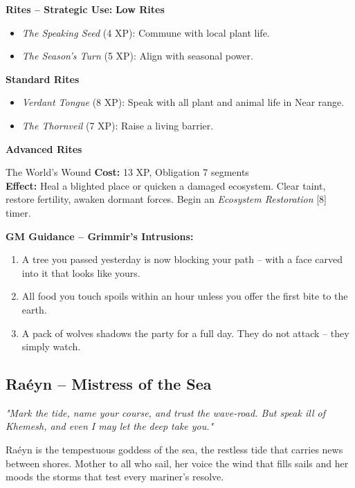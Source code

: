 \documentclass[10pt,a5paper]{book}
\begin{document}
\textbf{Rites -- Strategic Use:}
\textbf{Low Rites}
\begin{itemize}
    \item \textit{The Speaking Seed} (4 XP): Commune with local plant life.
    \item \textit{The Season's Turn} (5 XP): Align with seasonal power.
\end{itemize}
\textbf{Standard Rites}
\begin{itemize}
    \item \textit{Verdant Tongue} (8 XP): Speak with all plant and animal life in Near range.
    \item \textit{The Thornveil} (7 XP): Raise a living barrier.
\end{itemize}
\textbf{Advanced Rites}
\begin{patronbox}{The World's Wound}
\textbf{Cost:} 13 XP, Obligation 7 segments \\
\textbf{Effect:} Heal a blighted place or quicken a damaged ecosystem. Clear taint, restore fertility, awaken dormant forces. Begin an \textit{Ecosystem Restoration} [8] timer.
\end{patronbox}

\textbf{GM Guidance -- Grimmir's Intrusions:}
\begin{enumerate}
    \item A tree you passed yesterday is now blocking your path -- with a face carved into it that looks like yours.
    \item All food you touch spoils within an hour unless you offer the first bite to the earth.
    \item A pack of wolves shadows the party for a full day. They do not attack -- they simply watch.
\end{enumerate}

\clearpage

\subsection{Raéyn -- Mistress of the Sea}
\label{patron:raeyn}

\textit{"Mark the tide, name your course, and trust the wave‑road. But speak ill of Khemesh, and even I may let the deep take you."}

Raéyn is the tempestuous goddess of the sea, the restless tide that carries news between shores. Mother to all who sail, her voice the wind that fills sails and her moods the storms that test every mariner's resolve.
\end{document}
